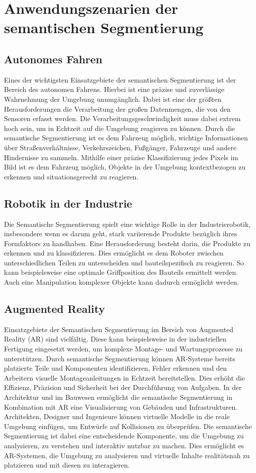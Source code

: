 \chapter{Anwendungszenarien der semantischen Segmentierung}
\section{Autonomes Fahren}
Eines der wichtigsten Einsatzgebiete der semantischen Segmentierung ist der
Bereich des autonomen Fahrens. Hierbei ist eine präzise und zuverlässige
Wahrnehmung der Umgebung unumgänglich. Dabei ist eine der größten
Herausforderungen die Verarbeitung der großen Datenmengen, die von den Sensoren
erfasst werden. Die Verarbeitungsgeschwindigkeit muss dabei extrem hoch sein,
um in Echtzeit auf die Umgebung reagieren zu können. Durch die semantische
Segmentierung ist es dem Fahrzeug möglich, wichtige Informationen über
Straßenverhältnisse, Verkehrszeichen, Fußgänger, Fahrzeuge und andere
Hindernisse zu sammeln. Mithilfe einer präzise Klassifizierung jedes Pixels im
Bild ist es dem Fahrzeug möglich, Objekte in der Umgebung kontextbezogen zu
erkennen und situationsgerecht zu reagieren.
\section{Robotik in der Industrie}

Die Semantische Segmentierung spielt eine wichtige Rolle in der
Industrierobotik, insbesondere wenn es darum geht, stark variierende Produkte
bezüglich ihres Formfaktors zu handhaben. Eine Herausforderung besteht darin,
die Produkte zu erkennen und zu klassifizieren. Dies ermöglicht es dem Roboter
zwischen unterschiedlichen Teilen zu unterscheiden und bauteilspezifisch zu
reagieren. So kann beispielsweise eine optimale Griffposition des Bauteils
ermittelt werden. Auch eine Manipulation komplexer Objekte kann dadurch
ermöglicht werden.

\section{Augmented Reality}
Einsatzgebiete der Semantischen Segmentierung im Bereich von Augmented Reality
(AR) sind vielfältig. Diese kann beispielsweise in der industriellen Fertigung
eingesetzt werden, um komplexe Montage- und Wartungsprozesse zu unterstützen.
Durch semantische Segmentierung können AR-Systeme bereits platzierte Teile und
Komponenten identifizieren, Fehler erkennen und den Arbeitern visuelle
Montageanleitungen in Echtzeit bereitstellen. Dies erhöht die Effizienz,
Präzision und Sicherheit bei der Durchführung von Aufgaben. In der Architektur
und im Bauwesen ermöglicht die semantische Segmentierung in Kombination mit AR
eine Visualisierung von Gebäuden und Infrastrukturen. Architekten, Designer und
Ingenieure können virtuelle Modelle in die reale Umgebung einfügen, um Entwürfe
auf Kollisionen zu überprüfen. Die semantische Segmentierung ist dabei eine
entscheidende Komponente, um die Umgebung zu analysieren, zu verstehen und
interaktiv nutzbar zu machen. Dies ermöglicht es AR-Systemen, die Umgebung zu
analysieren und virtuelle Inhalte realitätsnah zu platzieren und mit diesen zu
interagieren.

